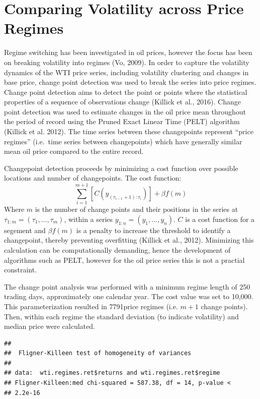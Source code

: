 \documentclass[]{article}
\begin{document}
\section{Comparing Volatility across Price
Regimes}\label{comparing-volatility-across-price-regimes}

Regime switching has been investigated in oil prices, however the focus
has been on breaking volatility into regimes (Vo, 2009). In order to
capture the volatility dynamics of the WTI price series, including
volatility clustering and changes in base price, change point detection
was used to break the series into price regimes. Change point detection
aims to detect the point or points where the statistical properties of a
sequence of observations change (Killick et al., 2016). Change point
detection was used to estimate changes in the oil price mean throughout
the period of record using the Pruned Exact Linear Time (PELT) algorithm
(Killick et al. 2012). The time series between these changepoints
represent ``price regimes'' (i.e.~time series between changepoints)
which have generally similar mean oil price compared to the entire
record.

Changepoint detection proceeds by minimizing a cost function over
possible locations and number of changepoints. The cost function:
\[\sum_{i=1}^{m+1}[C(y_{(\tau_{i-1}+1):\tau_i})]+\beta f(m) \] Where
\(m\) is the number of change points and their positions in the series
at \(\tau_{1:m}=(\tau_1,...,\tau_m)\), within a series
\(y_{1:n} = (y_1,...,y_n)\). \(C\) is a cost function for a segement and
\(\beta f(m)\) is a penalty to increase the threshold to identify a
changepoint, thereby preventing overfitting (Killick et al., 2012).
Minimizing this calculation can be computationally demanding, hence the
development of algorithms such as PELT, however for the oil price series
this is not a practial constraint.

The change point analysis was performed with a minimum regime length of
250 trading days, approximately one calendar year. The cost value was
set to 10,000. This parameterization resulted in 7791price regimes (i.e.
\(m+1\) change points). Then, within each regime the standard deviation
(to indicate volatility) and median price were calculated.

\begin{verbatim}
## 
##  Fligner-Killeen test of homogeneity of variances
## 
## data:  wti.regimes.ret$returns and wti.regimes.ret$regime
## Fligner-Killeen:med chi-squared = 587.38, df = 14, p-value <
## 2.2e-16
\end{verbatim}
\end{document}
